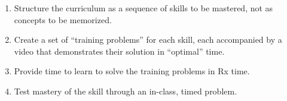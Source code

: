 \begin{enumerate}

\item Structure the curriculum as a sequence of skills to be mastered, not as concepts to be memorized. %

\item Create a set of ``training problems'' for each skill, each accompanied by a video that demonstrates their solution in ``optimal'' time. %

\item Provide time to learn to solve the training problems in Rx time. %

\item Test mastery of the skill through an in-class, timed problem. %


\end{enumerate}
